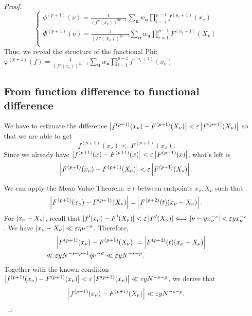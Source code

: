 \begin{proof}
\begin{equation}
    \begin{cases}
        \phi^{(p+1)}(\nu) = \frac{1}{(f''(x_\nu))^{2p-1}} \sum_{\mathbf{u}} w_\mathbf{u} \prod_{i = 1}^{p-1} f^{(u_i+1)}(x_\nu) \\
        \Phi^{(p+1)}(\nu) = \frac{1}{(F''(X_\nu))^{2p-1}} \sum_{\mathbf{u}} w_\mathbf{u} \prod_{i = 1}^{p-1} F^{(u_i+1)}(X_\nu) \\
    \end{cases}
\end{equation}
Thus, we reveal the structure of the functional Phi: $\varphi^{(p+1)}(f) = \frac{1}{(f''(x_\nu))^{2p-1}} \sum_{\mathbf{u}} w_\mathbf{u} \prod_{i = 1}^{p-1} f^{(u_i+1)}(x_\nu)$

\subsection*{From function difference to functional difference}
We have to estimate the difference $\left\lvert f^{(p+1)}(x_\nu) - F^{(p+1)}(X_\nu) \right\rvert < \varepsilon \left\lvert F^{(p+1)}(X_\nu) \right\rvert$ so that we are able to get $$f^{(p+1)}(x_\nu) \asymp_\varepsilon F^{(p+1)}(x_\nu).$$ Since we already have $\left\lvert f^{(p+1)}(x) - F^{(p+1)}(x) \right\rvert < \varepsilon \left\lvert F^{(p+1)}(x) \right\rvert$, what's left is $$\left\lvert F^{(p+1)}(x_\nu) - F^{(p+1)}(X_\nu) \right\rvert < \varepsilon \left\lvert F^{(p+1)}(X_\nu) \right\rvert.$$

We can apply the Mean Value Theorem: $\exists \; t$ between endpoints $x_\nu, X_\nu$ such that $$\left\lvert F^{(p+1)}(x_\nu) - F^{(p+1)}(X_\nu) \right\rvert = \left\lvert F^{(p+2)}(t)(x_\nu - X_\nu) \right\rvert.$$ For $\left\lvert x_\nu - X_\nu \right\rvert$, recall that $\left\lvert f'(x_\nu) - F'(X_\nu) \right\rvert < \varepsilon \left\lvert F'(X_\nu) \right\rvert \Longleftrightarrow \left\lvert \nu - yx_\nu^{-s} \right\rvert < \varepsilon yx_\nu^{-s}$. We have $\left\lvert x_\nu-X_\nu \right\rvert \ll \varepsilon \eta \nu^{-\sigma}$. Therefore, 
\begin{align}
    &\left\lvert F^{(p+1)}(x_\nu) - F^{(p+1)}(X_\nu) \right\rvert = \left\lvert F^{(p+2)}(t)(x_\nu - X_\nu) \right\rvert \\
    \ll \; &\varepsilon yN^{-s-p-1} \eta \nu^{-\sigma} \ll \varepsilon yN^{-s-p}.
\end{align}
Together with the known condition $\left\lvert f^{(p+1)}(x_\nu) - F^{(p+1)}(x_\nu) \right\rvert < \varepsilon \left\lvert F^{(p+1)}(x_\nu) \right\rvert \ll \varepsilon yN^{-s-p}$, we derive that $$\left\lvert f^{(p+1)}(x_\nu) - F^{(p+1)}(X_\nu) \right\rvert \ll \varepsilon yN^{-s-p}.$$


\end{proof}
